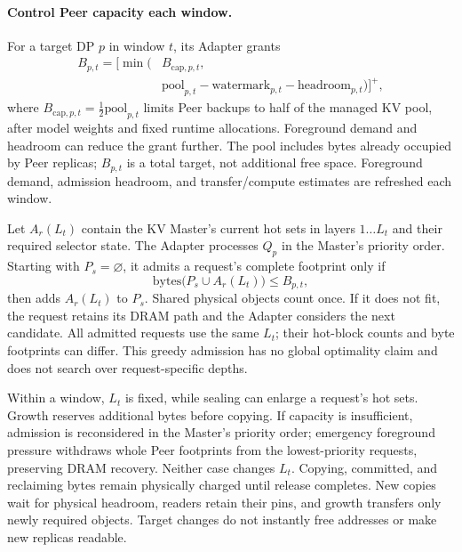 \paragraph{Control Peer capacity each window.}
For a target DP $p$ in window $t$, its Adapter grants
\begin{equation}
 \begin{aligned}
 B_{p,t}=\bigl[\min\bigl(&B_{\mathrm{cap},p,t},\\
 &\mathrm{pool}_{p,t}-\mathrm{watermark}_{p,t}
              -\mathrm{headroom}_{p,t}\bigr)\bigr]^+,
 \end{aligned}
 \label{eq:peer-budget}
\end{equation}
where $B_{\mathrm{cap},p,t}=\tfrac12\mathrm{pool}_{p,t}$ limits Peer
backups to half of the managed KV pool, after model weights and fixed
runtime allocations. Foreground demand and headroom can reduce the
grant further. The pool includes bytes already occupied by Peer replicas;
$B_{p,t}$ is a total target, not additional free space. Foreground demand,
admission headroom, and transfer/compute estimates are refreshed each window.

Let $A_r(L_t)$ contain the KV Master's current hot sets in layers
$1\ldots L_t$ and their required selector state. The Adapter processes
$Q_p$ in the Master's priority order. Starting with $P_s=\varnothing$,
it admits a request's complete footprint only if
\begin{equation}
 \mathrm{bytes}\bigl(P_s\cup A_r(L_t)\bigr)\le B_{p,t},
 \label{eq:resident-prefix}
\end{equation}
then adds $A_r(L_t)$ to $P_s$. Shared physical objects count once.
If it does not fit, the request retains its DRAM path and the Adapter
considers the next candidate. All admitted requests use the same $L_t$;
their hot-block counts and byte footprints can differ. This greedy
admission has no global optimality claim and does not search over
request-specific depths.

Within a window, $L_t$ is fixed, while sealing can enlarge a request's
hot sets. Growth reserves additional bytes before copying. If capacity
is insufficient, admission is reconsidered in the Master's priority
order; emergency foreground pressure withdraws whole Peer footprints
from the lowest-priority requests, preserving DRAM recovery. Neither
case changes $L_t$. Copying, committed, and reclaiming bytes remain
physically charged until release completes. New copies wait for physical
headroom, readers retain their pins, and growth transfers only newly
required objects. Target changes do not instantly free addresses or
make new replicas readable.

